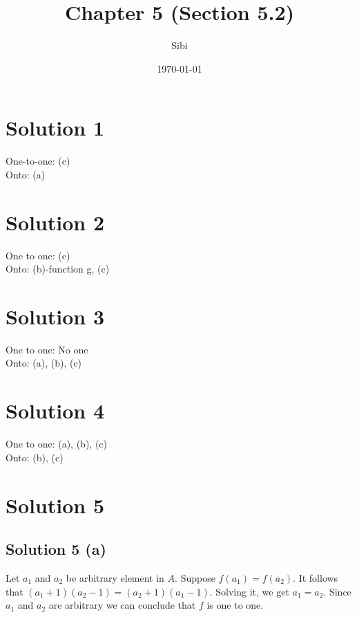 \documentclass{article}
\begin{document}
\title{Chapter 5 (Section 5.2)}
\author{Sibi}
\date{\today}
\maketitle

\DeclarePairedDelimiter\abs{\lvert}{\rvert}%
\DeclarePairedDelimiter\norm{\lVert}{\rVert}%

\makeatletter
\let\oldabs\abs
\def\abs{\@ifstar{\oldabs}{\oldabs*}}
%
\let\oldnorm\norm
\def\norm{\@ifstar{\oldnorm}{\oldnorm*}}
\makeatother
\newpage

\section{Solution 1}
One-to-one: (c) \\
Onto: (a)

\section{Solution 2}
One to one: (c) \\
Onto: (b)-function g, (c)

\section{Solution 3}
One to one: No one \\
Onto: (a), (b), (c)

\section{Solution 4}
One to one: (a), (b), (c) \\
Onto: (b), (c)

\section{Solution 5}
\subsection{Solution 5 (a)}
Let $a_1$ and $a_2$ be arbitrary element in $A$. Suppose $f(a_1) =
f(a_2)$. It follows that $(a_1 + 1)(a_2 - 1) = (a_2 + 1)(a_1 - 1)$.
Solving it, we get $a_1 = a_2$. Since $a_1$ and $a_2$ are arbitrary we
can conclude that $f$ is one to one.
\end{document}

